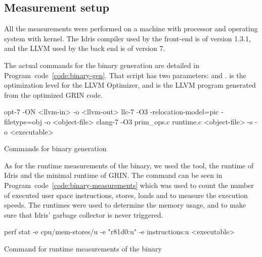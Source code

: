 \documentclass[main.tex]{subfiles}
\begin{document}
	\subsection{Measurement setup}
	
	All the measurements were performed on a machine with  processor and  operating system with  kernel. The Idris compiler used by the front-end is of version 1.3.1, and the LLVM used by the back end is of version 7.
	
	The actual commands for the binary generation are detailed in Program~code~\ref{code:binary-gen}. That script has two parameters:  and .  is the optimization level for the LLVM Optimizer, and  is the LLVM program generated from the optimized GRIN code.
	
	\vspace{-0.5cm}
	\begin{codeFloat}[h]
		\begin{bash}
			opt-7 -ON <llvm-in> -o <llvm-out> 
			llc-7 -O3 -relocation-model=pic -filetype=obj -o <object-file>
			clang-7 -O3 prim_ops.c runtime.c <object-file> -s -o <executable>
		\end{bash}
		\caption{Commands for binary generation}
		\label{code:binary-gen}
	\end{codeFloat}
	\vspace{-0.5cm}
	
	As for the runtime measurements of the binary, we used the  tool, the runtime of Idris and the minimal runtime of GRIN. The  command can be seen in Program~code~\ref{code:binary-measurements} which was used to count the number of executed user space instructions, stores, loads and to measure the execution speeds. The runtimes were used to determine the memory usage, and to make sure that Idris' garbage collector is never triggered.

	\vspace{-0.5cm}
	\begin{codeFloat}[h]
		\begin{bash}
			perf stat -e cpu/mem-stores/u -e "r81d0:u" -e instructions:u <executable>
		\end{bash}
		\caption{Command for runtime measurements of the binary}
		\label{code:binary-measurements}
	\end{codeFloat}
	\vspace{-0.5cm}
	
\end{document}

